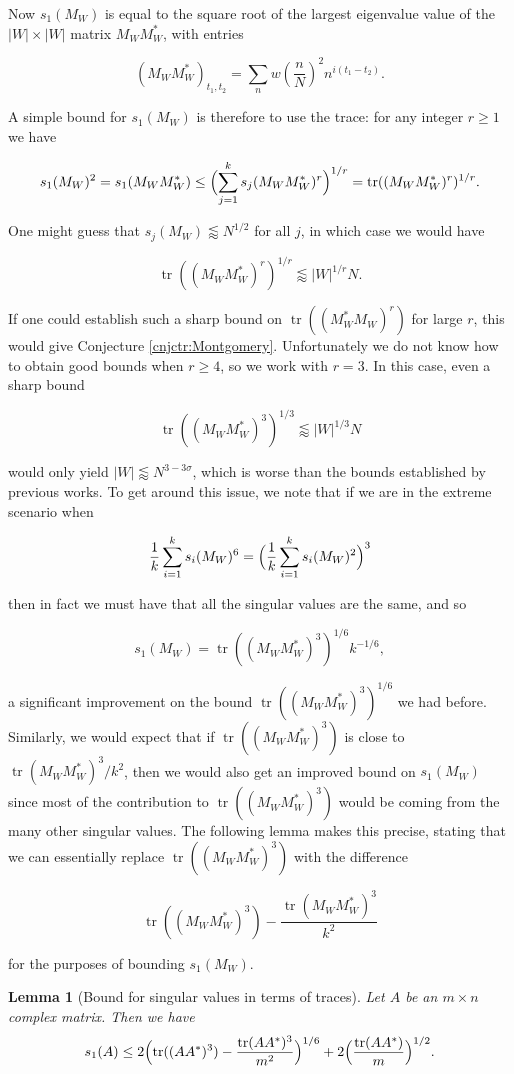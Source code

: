 \documentclass{amsart}
\theoremstyle{plain}
\newtheorem{lmm}[thrm]{Lemma}
\numberwithin{equation}{section}
\DeclareMathOperator*{\tr}{tr}
\begin{document}
Now $s_1(M_W)$ is equal to the square root of the largest eigenvalue value of the $|W|\times |W|$ matrix $M_W M_W^*$, with entries

\[
(M_W M_W^*)_{t_1,t_2}=\sum_{n} w \left( \frac{n}{N} \right)^2 n^{i(t_1-t_2)}.
\]

A simple bound for $s_1(M_W)$ is therefore to use the trace: for any integer $r\ge 1$ we have

\[
s_1(M_W)^2= s_1(M_W M_W^*)\le \Bigl(\sum_{j=1}^ks_j(M_W M_W^*)^r\Bigr)^{1/r}=\tr((M_W M_W^*)^r)^{1/r}.
\]

One might guess that $s_j(M_W)\lessapprox N^{1/2}$ for all $j$, in which case we would have 

\[
\tr((M_W M_W^*)^r)^{1/r}\lessapprox |W|^{1/r}N.
\]

 If one could establish such a sharp bound on $\tr((M_W^*M_W)^r)$ for large $r$, this would give Conjecture \ref{cnjctr:Montgomery}. Unfortunately we do not know how to obtain good bounds when $r\ge 4$, so we work with $r=3$. In this case, even a sharp bound 
 
 \[
 \tr((M_W M_W^*)^3)^{1/3}\lessapprox |W|^{1/3}N
 \]
 
  would only yield $|W|\lessapprox N^{3-3\sigma}$, which is worse than the bounds established by previous works. To get around this issue, we note that if we are in the extreme scenario when

\[
\frac{1}{k}\sum_{i=1}^{k} s_i(M_W)^6 =\Bigl(\frac{1}{k}\sum_{i=1}^{k} s_i(M_W)^2\Bigr)^3
\]

then in fact we must have that all the singular values are the same, and so 

\[
s_1(M_W)=\tr((M_WM_W^*)^3)^{1/6}k^{-1/6},
\]

 a significant improvement on the bound $\tr((M_WM_W^*)^3)^{1/6}$ we had before. Similarly, we would expect that if $\tr((M_WM_W^*)^3)$ is close to $\tr(M_WM_W^*)^3/k^{2}$, then we would also get an improved bound on $s_1(M_W)$ since most of the contribution to $\tr((M_WM_W^*)^3)$ would be coming from the many other singular values. The following lemma makes this precise, stating that we can essentially replace $\tr((M_WM_W^*)^3)$ with the difference 
 
 \[
 \tr((M_WM_W^*)^3)-\frac{\tr(M_WM_W^*)^3}{k^{2}}
 \]
 
  for the purposes of bounding $s_1(M_W)$.

%
%


\begin{lmm}[Bound for singular values in terms of traces]
Let $A$ be an $m\times n$ complex matrix. Then we have
\[
s_1(A)\le 2\Bigl(\tr((AA^*)^3)-\frac{\tr(AA^*)^3}{m^2}\Bigr)^{1/6}+2\Bigl(\frac{\tr(AA^*)}{m}\Bigr)^{1/2}.
\]
\end{lmm}
\end{document}
